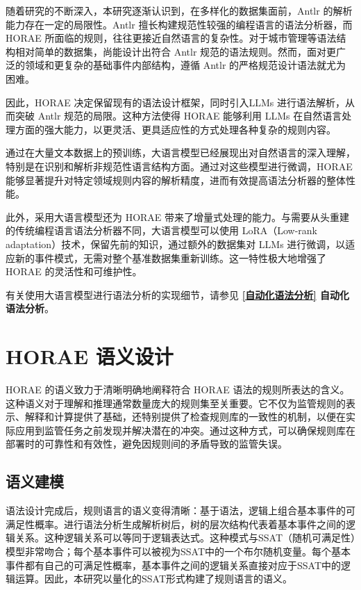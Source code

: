随着研究的不断深入，本研究逐渐认识到，在多样化的数据集面前，Antlr 的解析能力存在一定的局限性。Antlr 擅长构建规范性较强的编程语言的语法分析器，而 HORAE 所面临的规则，往往更接近自然语言的复杂性。对于城市管理等语法结构相对简单的数据集，尚能设计出符合 Antlr 规范的语法规则。然而，面对更广泛的领域和更复杂的基础事件内部结构，遵循 Antlr 的严格规范设计语法就尤为困难。

因此，HORAE 决定保留现有的语法设计框架，同时引入LLMs 进行语法解析，从而突破 Antlr 规范的局限。这种方法使得 HORAE 能够利用 LLMs 在自然语言处理方面的强大能力，以更灵活、更具适应性的方式处理各种复杂的规则内容。

通过在大量文本数据上的预训练，大语言模型已经展现出对自然语言的深入理解，特别是在识别和解析非规范性语言结构方面。通过对这些模型进行微调，HORAE 能够显著提升对特定领域规则内容的解析精度，进而有效提高语法分析器的整体性能。

此外，采用大语言模型还为 HORAE 带来了增量式处理的能力。与需要从头重建的传统编程语言语法分析器不同，大语言模型可以使用 LoRA\cite{hu2021lora}（Low-rank adaptation）技术，保留先前的知识，通过额外的数据集对 LLMs 进行微调，以适应新的事件模式，无需对整个基准数据集重新训练。这一特性极大地增强了 HORAE 的灵活性和可维护性。

有关使用大语言模型进行语法分析的实现细节，请参见 \textbf{\ref{自动化语法分析} 自动化语法分析}。

\newpage

\section{HORAE 语义设计}

HORAE 的语义致力于清晰明确地阐释符合 HORAE 语法的规则所表达的含义。这种语义对于理解和推理通常数量庞大的规则集至关重要。它不仅为监管规则的表示、解释和计算提供了基础，还特别提供了检查规则库的一致性的机制，以便在实际应用到监管任务之前发现并解决潜在的冲突。通过这种方式，可以确保规则库在部署时的可靠性和有效性，避免因规则间的矛盾导致的监管失误。

\subsection{语义建模}

语法设计完成后，规则语言的语义变得清晰：基于语法，逻辑上组合基本事件的可满足性概率。进行语法分析生成解析树后，树的层次结构代表着基本事件之间的逻辑关系。这种逻辑关系可以等同于逻辑表达式。这种模式与SSAT（随机可满足性）模型非常吻合；每个基本事件可以被视为SSAT中的一个布尔随机变量。每个基本事件都有自己的可满足性概率，基本事件之间的逻辑关系直接对应于SSAT中的逻辑运算。因此，本研究以量化的SSAT形式构建了规则语言的语义。

